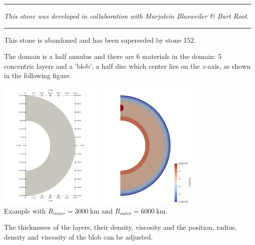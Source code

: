 \par\noindent\rule{\textwidth}{0.4pt}

{\sl This stone was developed in collaboration with Marjolein Blasweiler \& Bart Root}. 
 

\par\noindent\rule{\textwidth}{0.4pt}



{\Large This stone is abandoned and has been superseded by stone 152}.


The domain is a half annulus and there are 6 materials in the domain: 
5 concentric layers and a 'blob', a half disc which center lies on the $z$-axis,  
as shown in the following figure.
\begin{center}
\includegraphics[width=5cm]{python_codes/fieldstone_96/images/domain}
\includegraphics[width=5cm]{python_codes/fieldstone_96/images/domain2}\\
{\captionfont Example with $R_{inner}=3000~\si{\km}$ and $R_{outer}=6000~\si{\km}$.}
\end{center}
The thicknesses of the layers, their density, viscosity and the position, radius, density and viscosity 
of the blob can be adjusted. 

